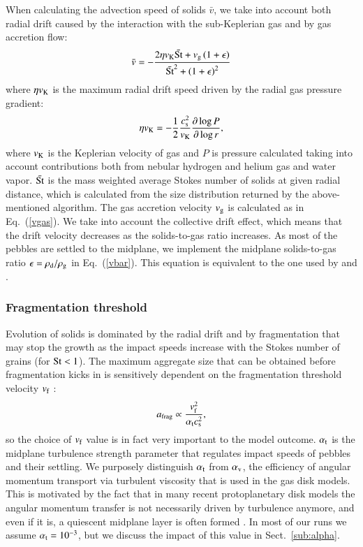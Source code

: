 \documentclass{aa}
\begin{document}
When calculating the advection speed of solids $\bar{v}$, we take into account both radial drift caused by the interaction with the sub-Keplerian gas and by gas accretion flow:
\begin{equation}\label{vbar}
\bar{v} = -\frac{2\eta v_{\rm K} \bar{\rm St} + v_{\rm g} \left(1+\epsilon\right)}{{\bar{\rm St}}^2 + \left(1+\epsilon\right)^2} 
\end{equation}
where $\eta v_{\rm K}$ is the maximum radial drift speed driven by the radial gas pressure gradient:
\begin{equation}
\eta v_{\rm K} = -\frac{1}{2}\frac{c_{\rm s}^2}{v_{\rm K}}\frac{\partial \log P}{\partial \log r},
\end{equation}
where $v_{\rm K}$ is the Keplerian velocity of gas and $P$ is pressure calculated taking into account contributions both from nebular hydrogen and helium gas and water vapor. $\bar{\rm St}$ is the mass weighted average Stokes number of solids at given radial distance, which is calculated from the size distribution returned by the above-mentioned algorithm. The gas accretion velocity $v_{\rm g}$ is calculated as in Eq.~(\ref{vgas}). We take into account the collective drift effect, which means that the drift velocity decreases as the solids-to-gas ratio increases. As most of the pebbles are settled to the midplane, we implement the midplane solids-to-gas ratio $\epsilon=\rho_{\rm d}/\rho_{\rm g}$ in Eq.~(\ref{vbar}). This equation is equivalent to the one used by \citet{2016A&A...596L...3I} and \citet{2017A&A...602A..21S}. 

\subsubsection{Fragmentation threshold}\label{sub:vf}

Evolution of solids is dominated by the radial drift and by fragmentation that may stop the growth as the impact speeds increase with the Stokes number of grains (for ${\rm St}<1$). The maximum aggregate size that can be obtained before fragmentation kicks in is sensitively dependent on the fragmentation threshold velocity $v_{\rm f}$ \citep[see][]{2012A&A...539A.148B}:
\begin{equation}\label{afrag}
a_{\rm{frag}} \propto \frac{v_{\rm{f}}^2}{\alpha_{\rm t} c_{\rm{s}}^2},
\end{equation}
so the choice of $v_{\rm{f}}$ value is in fact very important to the model outcome.  $\alpha_{\rm t}$ is the midplane turbulence strength parameter that regulates impact speeds of pebbles and their settling. We purposely distinguish $\alpha_{\rm t}$ from $\alpha_{\rm v}$, the efficiency of angular momentum transport via turbulent viscosity that is used in the gas disk models. This is motivated by the fact that in many recent protoplanetary disk models the angular momentum transfer is not necessarily driven by turbulence anymore, and even if it is, a quiescent midplane layer is often formed \citep{2013ApJ...765..114D, 2014prpl.conf..411T, 2016ApJ...821...80B}. In most of our runs we assume $\alpha_{\rm t} = 10^{-3}$, but we discuss the impact of this value in Sect.~\ref{sub:alpha}.
\end{document}
